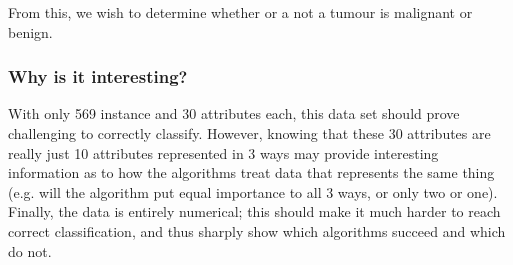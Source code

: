 From this, we wish to determine whether or a not a tumour is malignant or benign.

\subsubsection{Why is it interesting?}
With only 569 instance and 30 attributes each, this data set should prove challenging to correctly classify. However, knowing that these 30 attributes are really just 10 attributes represented in 3 ways may provide interesting information as to how the algorithms treat data that represents the same thing (e.g. will the algorithm put equal importance to all 3 ways, or only two or one). Finally, the data is entirely numerical; this should make it much harder to reach correct classification, and thus sharply show which algorithms succeed and which do not.